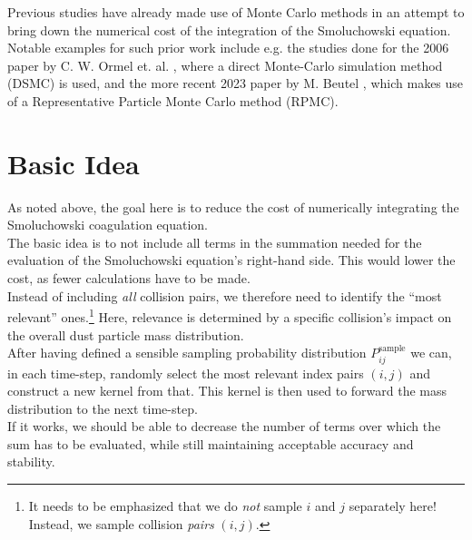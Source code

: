     Previous studies have already made use of Monte Carlo methods in an attempt to 
    bring down the numerical cost of the integration of the Smoluchowski equation. \\

    Notable examples for such prior work include e.g. the studies done for the 
    2006 paper by C. W. Ormel et. al. \cite{ormel_2006}, where a 
    direct Monte-Carlo simulation method (DSMC) is used, and 
    the more recent 2023 paper by M. Beutel \cite{beutel_2023},
    which makes use of a Representative Particle Monte Carlo method (RPMC). \\


\section{Basic Idea}

    As noted above, the goal here is to reduce the cost of numerically integrating the 
    Smoluchowski coagulation equation. \\

    The basic idea is to not include all terms in the summation needed for the evaluation 
    of the Smoluchowski equation's right-hand side. This would lower the cost, as fewer 
    calculations have to be made. \\

    Instead of including \textit{all} collision pairs, we therefore need to identify the ``most 
    relevant'' ones.\footnote{
        It needs to be emphasized that we do \textit{not} sample $i$ and $j$ separately here! 
        Instead, we sample collision \textit{pairs} $(i, j)$.
    }
    Here, relevance is determined by a specific collision's impact on the overall 
    dust particle mass distribution. \\

    After having defined a sensible sampling probability distribution           
    $P_{ij}^\text{sample}$ we can, in each time-step, randomly select the most relevant 
    index pairs $(i, j)$ and construct a new kernel from that.
    This kernel is then used to forward the mass distribution to the next time-step. \\

    If it works, we should be able to decrease the number of terms over which the sum has
    to be evaluated, while still maintaining acceptable accuracy and stability. \\

